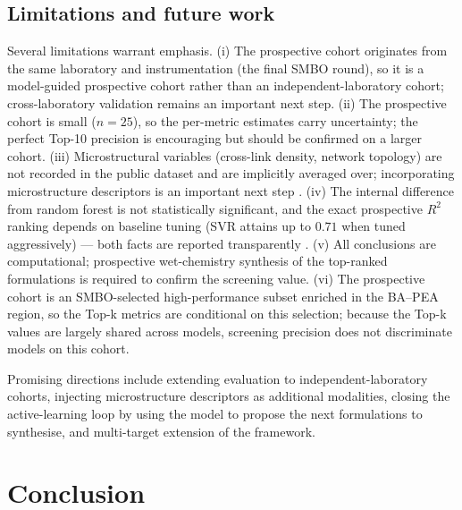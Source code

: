 \documentclass[utf8]{FrontiersinHarvard}
\begin{document}
\subsection{Limitations and future work}

Several limitations warrant emphasis. (i) The prospective cohort originates from the same laboratory and instrumentation (the final SMBO round), so it is a model-guided prospective cohort rather than an independent-laboratory cohort; cross-laboratory validation remains an important next step. (ii) The prospective cohort is small ($n=25$), so the per-metric estimates carry uncertainty; the perfect Top-10 precision is encouraging but should be confirmed on a larger cohort. (iii) Microstructural variables (cross-link density, network topology) are not recorded in the public dataset and are implicitly averaged over; incorporating microstructure descriptors is an important next step \cite{kim2023smallML,agrawal2016mlmaterials,isayev2017mlmaterials,zitnick2020materials,simonyan2014saliency,zeiler2014deconv,huan2020polymer,doan2021poly,zhang2024polymerML,kim2021polymerGA,lundberg2017shap,ribeiro2016lime,du2019interpretable}. (iv) The internal difference from random forest is not statistically significant, and the exact prospective $R^2$ ranking depends on baseline tuning (SVR attains up to $0.71$ when tuned aggressively) --- both facts are reported transparently \cite{wu2019thermal,chen2019cgcnn,jha2018elemnet,schleder2019deep,kim2018polygenome,merchant2023materials,ward2018mlcomposite}. (v) All conclusions are computational; prospective wet-chemistry synthesis of the top-ranked formulations is required to confirm the screening value. (vi) The prospective cohort is an SMBO-selected high-performance subset enriched in the BA--PEA region, so the Top-k metrics are conditional on this selection; because the Top-k values are largely shared across models, screening precision does not discriminate models on this cohort.

Promising directions include extending evaluation to independent-laboratory cohorts, injecting microstructure descriptors as additional modalities, closing the active-learning loop by using the model to propose the next formulations to synthesise, and multi-target extension of the framework.

\section{Conclusion}
\end{document}
